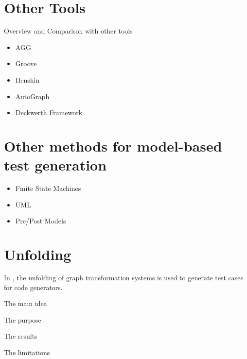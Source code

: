 \section{Other Tools}

Overview and Comparison with other tools

\begin{itemize}
\item AGG
\item Groove
\item Henshin
\item AutoGraph
\item Deckwerth Framework
\end{itemize}

\section{Other methods for model-based test generation}

\begin{itemize}
  \item Finite State Machines
  \item UML
  \item Pre/Post Models
\end{itemize}

\section{Unfolding}

In \cite{Baldan2004}, the unfolding of graph transformation systems is used to generate test cases for code generators. 

The main idea

The purpose

The results

The limitations

